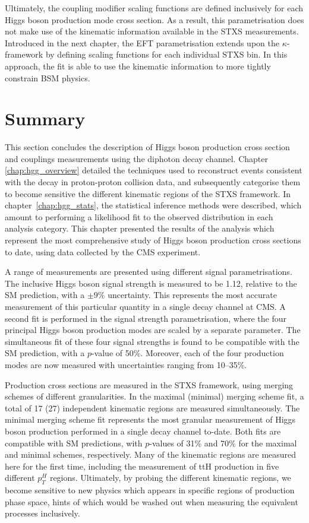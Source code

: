 Ultimately, the coupling modifier scaling functions are defined inclusively for each Higgs boson production mode cross section. As a result, this parametrisation does not make use of the kinematic information available in the STXS measurements. Introduced in the next chapter, the EFT parametrisation extends upon the $\kappa$-framework by defining scaling functions for each individual STXS bin. In this approach, the fit is able to use the kinematic information to more tightly constrain BSM physics.

\FloatBarrier

\section{Summary}
This section concludes the description of Higgs boson production cross section and couplings measurements using the diphoton decay channel. Chapter \ref{chap:hgg_overview} detailed the techniques used to reconstruct events consistent with the \Hgg decay in proton-proton collision data, and subsequently categorise them to become sensitive the different kinematic regions of the STXS framework. In chapter~\ref{chap:hgg_stats}, the statistical inference methods were described, which amount to performing a likelihood fit to the observed \mgg distribution in each analysis category. This chapter presented the results of the analysis which represent the most comprehensive study of Higgs boson production cross sections to date, using data collected by the CMS experiment.

A range of measurements are presented using different signal parametrisations. The inclusive Higgs boson signal strength is measured to be 1.12, relative to the SM prediction, with a $\pm 9\%$ uncertainty. This represents the most accurate measurement of this particular quantity in a single decay channel at CMS. A second fit is performed in the signal strength parametrisation, where the four principal Higgs boson production modes are scaled by a separate parameter. The simultaneous fit of these four signal strengths is found to be compatible with the SM prediction, with a $p$-value of 50\%. Moreover, each of the four production modes are now measured with uncertainties ranging from 10--35\%.

Production cross sections are measured in the STXS framework, using merging schemes of different granularities. In the maximal (minimal) merging scheme fit, a total of 17 (27) independent kinematic regions are measured simultaneously. The minimal merging scheme fit represents the most granular measurement of Higgs boson production performed in a single decay channel to-date. Both fits are compatible with SM predictions, with $p$-values of 31\% and 70\% for the maximal and minimal schemes, respectively. Many of the kinematic regions are measured here for the first time, including the measurement of ttH production in five different $p_T^H$ regions. Ultimately, by probing the different kinematic regions, we become sensitive to new physics which appears in specific regions of production phase space, hints of which would be washed out when measuring the equivalent processes inclusively. 


